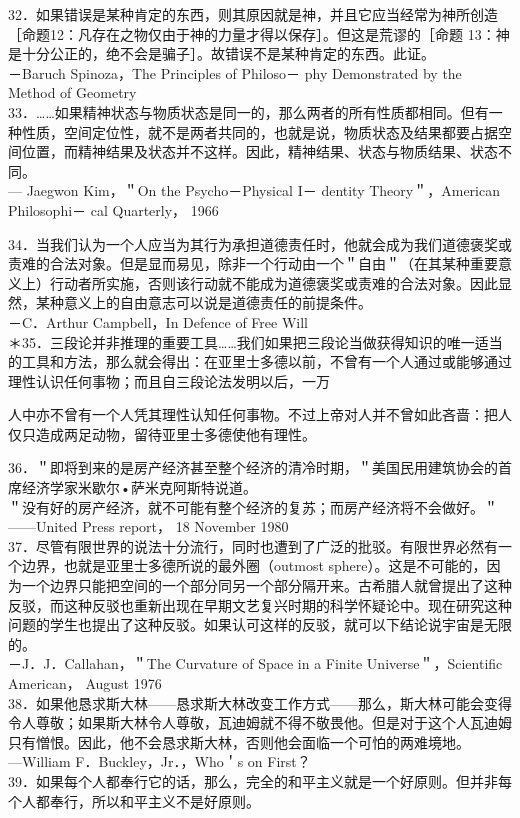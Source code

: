 32．如果错误是某种肯定的东西，则其原因就是神，并且它应当经常为神所创造［命题12：凡存在之物仅由于神的力量才得以保存］。但这是荒谬的［命题 13：神是十分公正的，绝不会是骗子］。故错误不是某种肯定的东西。此证。\\
－Baruch Spinoza，The Principles of Philoso－ phy Demonstrated by the Method of Geometry\\
33．……如果精神状态与物质状态是同一的，那么两者的所有性质都相同。但有一种性质，空间定位性，就不是两者共同的，也就是说，物质状态及结果都要占据空间位置，而精神结果及状态并不这样。因此，精神结果、状态与物质结果、状态不同。\\
— Jaegwon Kim，＂On the Psycho－Physical I－ dentity Theory＂，American Philosophi－ cal Quarterly， 1966

34．当我们认为一个人应当为其行为承担道德责任时，他就会成为我们道德褒奖或责难的合法对象。但是显而易见，除非一个行动由一个＂自由＂（在其某种重要意义上）行动者所实施，否则该行动就不能成为道德褒奖或责难的合法对象。因此显然，某种意义上的自由意志可以说是道德责任的前提条件。\\
－C．Arthur Campbell，In Defence of Free Will\\
＊35．三段论并非推理的重要工具……我们如果把三段论当做获得知识的唯一适当的工具和方法，那么就会得出：在亚里士多德以前，不曾有一个人通过或能够通过理性认识任何事物；而且自三段论法发明以后，一万

人中亦不曾有一个人凭其理性认知任何事物。不过上帝对人并不曾如此吝啬：把人仅只造成两足动物，留待亚里士多德使他有理性。

36．＂即将到来的是房产经济甚至整个经济的清冷时期，＂美国民用建筑协会的首席经济学家米歇尔•萨米克阿斯特说道。\\
＂没有好的房产经济，就不可能有整个经济的复苏；而房产经济将不会做好。＂\\
——United Press report， 18 November 1980\\
37．尽管有限世界的说法十分流行，同时也遭到了广泛的批驳。有限世界必然有一个边界，也就是亚里士多德所说的最外圈（outmost sphere）。这是不可能的，因为一个边界只能把空间的一个部分同另一个部分隔开来。古希腊人就曾提出了这种反驳，而这种反驳也重新出现在早期文艺复兴时期的科学怀疑论中。现在研究这种问题的学生也提出了这种反驳。如果认可这样的反驳，就可以下结论说宇宙是无限的。\\
－J．J．Callahan，＂The Curvature of Space in a Finite Universe＂，Scientific American， August 1976\\
38．如果他恳求斯大林——恳求斯大林改变工作方式——那么，斯大林可能会变得令人尊敬；如果斯大林令人尊敬，瓦迪姆就不得不敬畏他。但是对于这个人瓦迪姆只有憎恨。因此，他不会恳求斯大林，否则他会面临一个可怕的两难境地。\\
—William F．Buckley，Jr．，Who＇s on First？\\
39．如果每个人都奉行它的话，那么，完全的和平主义就是一个好原则。但并非每个人都奉行，所以和平主义不是好原则。



